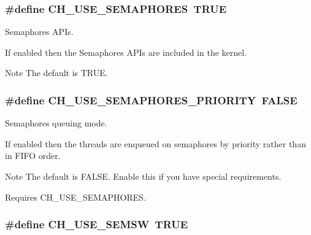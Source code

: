 \subsubsection[{C\+H\+\_\+\+U\+S\+E\+\_\+\+S\+E\+M\+A\+P\+H\+O\+R\+E\+S}]{\setlength{\rightskip}{0pt plus 5cm}\#define C\+H\+\_\+\+U\+S\+E\+\_\+\+S\+E\+M\+A\+P\+H\+O\+R\+E\+S~T\+R\+U\+E}\label{group__config_gab88f410fdc6a67192194a8431d991b27}


Semaphores A\+P\+Is. 

If enabled then the Semaphores A\+P\+Is are included in the kernel.

\begin{DoxyNote}{Note}
The default is {\ttfamily T\+R\+U\+E}. 
\end{DoxyNote}
\hypertarget{group__config_ga866568c0387963f11c078a8d939c2284}{}
\subsubsection[{C\+H\+\_\+\+U\+S\+E\+\_\+\+S\+E\+M\+A\+P\+H\+O\+R\+E\+S\+\_\+\+P\+R\+I\+O\+R\+I\+T\+Y}]{\setlength{\rightskip}{0pt plus 5cm}\#define C\+H\+\_\+\+U\+S\+E\+\_\+\+S\+E\+M\+A\+P\+H\+O\+R\+E\+S\+\_\+\+P\+R\+I\+O\+R\+I\+T\+Y~F\+A\+L\+S\+E}\label{group__config_ga866568c0387963f11c078a8d939c2284}


Semaphores queuing mode. 

If enabled then the threads are enqueued on semaphores by priority rather than in F\+I\+F\+O order.

\begin{DoxyNote}{Note}
The default is {\ttfamily F\+A\+L\+S\+E}. Enable this if you have special requirements. 

Requires {\ttfamily C\+H\+\_\+\+U\+S\+E\+\_\+\+S\+E\+M\+A\+P\+H\+O\+R\+E\+S}. 
\end{DoxyNote}
\hypertarget{group__config_gae9e6ff0fe1964761ea6e1bce51d8ee59}{}
\subsubsection[{C\+H\+\_\+\+U\+S\+E\+\_\+\+S\+E\+M\+S\+W}]{\setlength{\rightskip}{0pt plus 5cm}\#define C\+H\+\_\+\+U\+S\+E\+\_\+\+S\+E\+M\+S\+W~T\+R\+U\+E}\label{group__config_gae9e6ff0fe1964761ea6e1bce51d8ee59}


